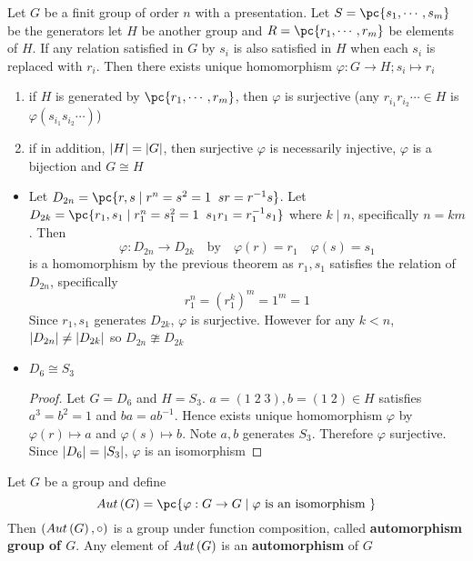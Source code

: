 \documentclass[11pt]{article}
\begin{document}
\begin{definition*}
     Let $G$ be a finit group of order $n$ with a presentation. Let $S=\pc{s_1,\cdots,s_m}$ be the generators let $H$ be another group and $R=\pc{r_1,\cdots,r_m}$ be elements of $H$. If any relation satisfied in $G$ by $s_i$ is also satisfied in $H$ when each $s_i$ is replaced with $r_i$. Then there exists unique homomorphism $\varphi:G\to H; s_i \mapsto r_i$
    \begin{enumerate}
        \item if $H$ is generated by $\pc{r_1,\cdots,r_m}$, then $\varphi$ is surjective (any $r_{i_1} r_{i_2} \cdots \in H$ is $\varphi(s_{i_1} s_{i_2} \cdots)$)
        \item if in addition, $\left|H\right|=\left|G\right|$, then surjective $\varphi$ is necessarily injective, $\varphi$ is a bijection and $G\cong H$ 
    \end{enumerate}
    \begin{itemize}
        \item Let $D_{2n} = \pc{r,s \mid r^n = s^2 = 1 \;\; sr = r^{-1}s}$. Let $D_{2k} = \pc{r_1,s_1 \mid r_1^n = s_1^2 = 1 \;\; s_1r_1 = r_1^{-1}s_1}$ where $k\mid n$, specifically $n=km$. Then 
        \[
            \varphi: D_{2n} \to D_{2k} 
            \quad \text{by} \quad
            \varphi(r) = r_1
            \quad
            \varphi(s) = s_1    
        \]
        is a homomorphism by the previous theorem as $r_1,s_1$ satisfies the relation of $D_{2n}$, specifically
        \[
            r_1^n = (r_1^k)^m = 1^m = 1    
        \] 
        Since $r_1,s_1$ generates $D_{2k}$, $\varphi$ is surjective. However for any $k<n$, $\left|D_{2n}\right| \neq \left|D_{2k}\right|$ so $D_{2n} \ncong D_{2k}$
        \item $D_6 \cong S_3$
        \begin{proof}
            Let $G=D_6$ and $H=S_3$. $a=(1\;2\;3), b=(1\;2)\in H$ satisfies $a^3=b^2=1$ and $ba=ab^{-1}$. Hence exists unique homomorphism $\varphi$ by $\varphi(r) \mapsto a$ and $\varphi(s) \mapsto b$. Note $a,b$ generates $S_3$. Therefore $\varphi$ surjective. Since $\left|D_6\right| = \left|S_3\right|$, $\varphi$ is an isomorphism 
        \end{proof}
    \end{itemize}
\end{definition*}

\begin{definition*}
     Let $G$ be a group and define
    \[
        \aut{G} = \pc{
            \varphi: G\to G \mid \varphi \text{ is an isomorphism }
        }
    \]
    Then $(Aut\left(G\right), \circ)$ is a group under function composition, called \textbf{automorphism group of $G$}. Any element of $Aut\left(G\right)$ is an \textbf{automorphism} of $G$
\end{definition*}
\end{document}
